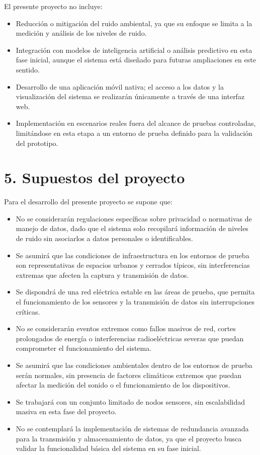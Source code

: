 \documentclass[
11pt, %
]{charter}
\begin{document}
El presente proyecto no incluye:
\begin{itemize}
    \item Reducción o mitigación del ruido ambiental, ya que su enfoque se limita a la medición y análisis de los niveles de ruido.
    \item Integración con modelos de inteligencia artificial o análisis predictivo en esta fase inicial, aunque el sistema está diseñado para futuras ampliaciones en este sentido.
    \item Desarrollo de una aplicación móvil nativa; el acceso a los datos y la visualización del sistema se realizarán únicamente a través de una interfaz web.
    \item Implementación en escenarios reales fuera del alcance de pruebas controladas, limitándose en esta etapa a un entorno de prueba definido para la validación del prototipo.
\end{itemize}

\section{5. Supuestos del proyecto}
\label{sec:supuestos}

Para el desarrollo del presente proyecto se supone que:

\begin{itemize}
    \item No se considerarán regulaciones específicas sobre privacidad o normativas de manejo de datos, dado que el sistema solo recopilará información de niveles de ruido sin asociarlos a datos personales o identificables.
    \item Se asumirá que las condiciones de infraestructura en los entornos de prueba son representativas de espacios urbanos y cerrados típicos, sin interferencias extremas que afecten la captura y transmisión de datos.
    \item Se dispondrá de una red eléctrica estable en las áreas de prueba, que permita el funcionamiento de los sensores y la transmisión de datos sin interrupciones críticas.
    \item No se considerarán eventos extremos como fallos masivos de red, cortes prolongados de energía o interferencias radioeléctricas severas que puedan comprometer el funcionamiento del sistema.
    \item Se asumirá que las condiciones ambientales dentro de los entornos de prueba serán normales, sin presencia de factores climáticos extremos que puedan afectar la medición del sonido o el funcionamiento de los dispositivos.
    \item Se trabajará con un conjunto limitado de nodos sensores, sin escalabilidad masiva en esta fase del proyecto.
    \item No se contemplará la implementación de sistemas de redundancia avanzada para la transmisión y almacenamiento de datos, ya que el proyecto busca validar la funcionalidad básica del sistema en su fase inicial.
\end{itemize}
\end{document}
